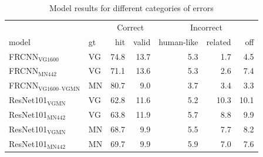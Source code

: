 \begin{table}[t]
\centering
	\small
\begin{tabular}{ll||rr|rrr}
\toprule
&  & \multicolumn{2}{c|}{Correct} & \multicolumn{3}{c}{Incorrect}\\
                         model &  gt &  hit &  valid &  human-like &  related &  off \\
\midrule
       FRCNN$_{\text{VG1600}}$ &  VG & 74.8 &     13.7 &         5.3 &      1.7 &    4.5 \\
        FRCNN$_{\text{MN442}}$ &  VG & 71.1 &     13.6 &         5.3 &      2.6 &    7.4 \\
        \midrule
 FRCNN$_{\text{VG1600--VGMN}}$ &  MN & 80.7 &      9.0 &         3.7 &      3.4 &    3.3 \\
         \midrule
     ResNet101$_{\text{VGMN}}$ &  VG & 62.8 &     11.6 &         5.2 &     10.3 &   10.1 \\
         ResNet101$_{\text{MN442}}$ &  VG & 63.8 &     11.9 &         5.7 &      8.8 &    9.9 \\
     ResNet101$_{\text{VGMN}}$ &  MN & 68.7 &      9.9 &         5.5 &      7.7 &    8.2 \\
    ResNet101$_{\text{MN442}}$ &  MN & 69.7 &      9.9 &         5.9 &      7.0 &    7.6 \\
\bottomrule
\end{tabular}

\caption{Model results for different categories of errors} \label{tab:humanlike}
\end{table}


